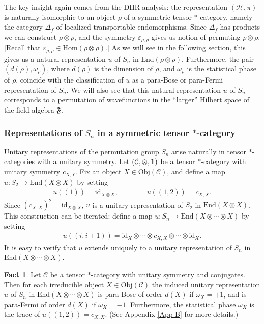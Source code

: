 \documentclass[11pt]{article}
\theoremstyle{definition}
\newtheorem{fact}[thm]{Fact}
\theoremstyle{definition}
\theoremstyle{remark}
\newcommand{\Obj}{\mathrm{Obj}}
\newcommand{\ve}{\varepsilon}
\def\2#1{{\mathcal #1}}
\def\1#1{{\bf #1}}
\def\al#1{{\mathfrak #1}}
\def\om{\omega} \def\Om{\Omega} \def\dd{\partial} \def\D{\Delta}
\newcommand{\Hom}{\mathrm{Hom}}
\newcommand{\End}{\mathrm{End}}
\def\id{\mathrm{id}}
\begin{document}
The key insight again comes from the DHR analysis: the
representation $(\2H ,\pi )$ is naturally isomorphic to
an object $\rho$ of a symmetric tensor $*$-category,
namely the category $\D _f$ of localized transportable
endomorphisms.  Since $\D _f$ has products we can
construct $\rho \otimes \rho$, and the symmetry $\ve
_{\rho ,\rho }$ gives us notion of permuting $\rho
\otimes \rho$.  [Recall that $\ve _{\rho ,\rho }\in
\Hom (\rho \otimes \rho )$.]  As we will see in the
following section, this gives us a natural
representation $u$ of $S_n$ in $\End (\rho \otimes \rho
)$.  Furthermore, the pair $(d(\rho ), \om _\rho )$,
where $d(\rho )$ is the dimension of $\rho$, and $\om
_\rho$ is the statistical phase of $\rho$, coincide
with the classification of $u$ as a para-Bose or
para-Fermi representation of $S_n$.  We will also see
that this natural representation $u$ of $S_n$
corresponds to a permutation of wavefunctions in the
``larger'' Hilbert space of the field algebra $\al F$.

\subsubsection{Representations of $S_n$ in a symmetric tensor
  $*$-category}

Unitary representations of the permutation group $S_n$ arise naturally
in tensor $*$-categories with a unitary symmetry.  Let $(\2C ,\otimes,
\11)$ be a tensor $*$-category with unitary symmetry $c_{X,Y}$.  Fix
an object $X\in \Obj (\2C )$, and define a map $u:S_2\to \End
(X\otimes X)$ by setting
\begin{eqnarray*}
  u((1)) = \id _{X\otimes X} ,\qquad \qquad u((1,2))= c_{X,X}
  .\end{eqnarray*}
Since $(c_{X,X})^{2}=\id _{X\otimes X}$, $u$ is a unitary
representation of $S_2$ in $\End (X\otimes X)$.  This construction can be iterated: define a map $u:S_n\to \End
(X\otimes \cdots \otimes X)$ by setting
\begin{eqnarray*} u((i,i+1))= \id _X\otimes \cdots \otimes
  c_{X,X}\otimes \cdots \otimes \id _X .\end{eqnarray*} It is easy to
verify that $u$ extends uniquely to a unitary representation of $S_n$
in $\End (X\otimes \cdots \otimes X)$.

\begin{fact} Let $\2C$ be a tensor $*$-category with
  unitary symmetry and conjugates.  Then for each
  irreducible object $X\in \Obj (\2C )$ the induced
  unitary representation $u$ of $S_n$ in $\End
  (X\otimes \cdots \otimes X)$ is para-Bose of order
  $d(X)$ if $\om _X =+1$, and is para-Fermi of order
  $d(X)$ if $\om _X=-1$.  Furthermore, the statistical
  phase $\om _X$ is the trace of $u((1,2))=c_{X,X}$.
  (See Appendix \ref{App-B} for more details.)
  \label{risque}
\end{fact}
\end{document}
